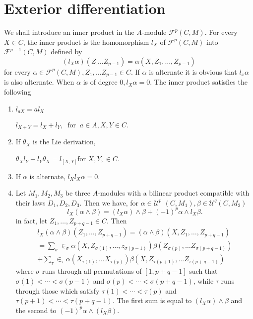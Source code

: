 \section{Exterior differentiation}\label{chap1:sec6} %

We shall introduce an inner product in the $A$-module
$\mathscr{F}^p(C,M)$. For every $X \in C$, the inner product is the
homomorphism $l_X$ of $\mathscr{F}^p(C,M)$ into
$\mathscr{F}^{p-1}(C,M)$ defined by  
$$
(l_X \alpha ) (Z_, \ldots Z_{p-1}) = \alpha (X, Z_1, \ldots , Z_{p-1})
$$
for every $\alpha \in \mathscr{F}^p (C,M), Z_1, \ldots Z_{p-1} \in
C$. If $\alpha$ is alternate it is obvious that $l_x \alpha$ is also
alternate. When $\alpha$ is of degree $0,l_X \alpha =0$. The inner
product satisfies the following 
\begin{enumerate}
\item $l_{aX}= a l_X$

  $l_{X+Y} = l_X + l_Y, ~ \text{ for } ~ a  \in A, X, Y \in C$.
\item If $\theta_X$ is the Lie derivation,

  $\theta_X l_Y - l_Y \theta_X = l_{[X,Y]}$\pageoriginale for $X, Y, \in C$.
\item If $\alpha$ is alternate, $l_X l_X \alpha = 0$.
\item Let $M_1, M_2, M_3$ be three $A$-modules with a bilinear product
  compatible with their laws $D_1, D_2, D_3$. Then we have, for
  $\alpha \in \mathscr{U}^p$ $(C,M_1), \beta \in  \mathscr{U}^q(C,M_2)$ 
  $$
  l_X (\alpha \wedge \beta) = (l_X \alpha) \wedge \beta +(-1)^p \alpha
  \wedge l_X \beta.  
  $$
  in fact, let $Z_1, \ldots , Z_{p+q-1} \in C$. Then 
\begin{multline*}
  l_X (\alpha \wedge \beta) (Z_1, \ldots , Z_{p+q-1})  = (\alpha \wedge
  \beta) (X,Z_1, \ldots , Z_{p+q-1}) \\
  = \sum_\sigma \in _\sigma \alpha (X,Z_{\sigma (1)}, \ldots ,
  z_{\sigma (p-1)}) \beta(Z_{\sigma (p)} , \dots Z_{\sigma (p+q- 1)})\\
   + \sum_\tau \in _\tau \alpha (X_{\tau (1)},  \ldots  X_{\tau(p)})
  \beta(X,Z_{\tau(p+1)} , \ldots Z_{\tau (p+q-1)})  
\end{multline*}
 where $\sigma$ runs through all permutations of $[1,p+q-1]$ such that
 $\sigma (1) < \cdots < \sigma(p-1)$ and $\sigma(p) < \cdots <
 \sigma(p+q-1)$, while $\tau$ runs through those which satisfy
 $\tau(1) < \cdots  < \tau (p)$ and $\tau(p+1) < \cdots <
 \tau(p+q-1)$. The first sum is equal to $(l_X \alpha) \wedge \beta$
 and the second to $(-1)^p \alpha \wedge (l_X \beta)$. 
\end{enumerate}

